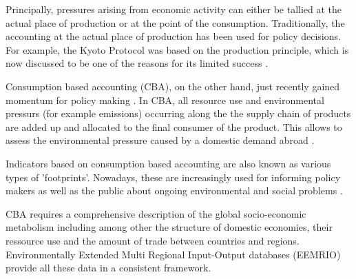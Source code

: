 Principally, pressures arising from economic activity can either be tallied at
the actual place of production or at the point of the consumption.
Traditionally, the accounting at the actual place of production has been used
for policy decisions. For example, the Kyoto Protocol was based on the
production principle, which is now discussed to be one of the reasons for its
limited success \cite{23192129}. 

Consumption based accounting (CBA), on the other hand, just recently gained
momentum for policy making \cite{Harris_2013}. In CBA, all resource use and environmental
pressurs (for example emissions) occurring along the the supply chain of
products are added up and allocated to the final consumer of the product. This
allows to assess the environmental pressure caused by a domestic
demand abroad \cite{Weinzettel_2013, 20212122}.

Indicators based on consumption based accounting are also known as various
types of 'footprints'. Nowadays, these are increasingly used for informing policy makers as
well as the public about ongoing environmental \cite{tukker_global_2014, steen-olsen_carbon_2012, Kanemoto_2014}\cite{united_nations_university_inclusive_2012}
and social problems \cite{Simas_2014}. 

CBA requires a comprehensive description of the global socio-economic
metabolism including among other the structure of domestic economies, their
ressource use and the amount of trade between countries and regions.
Environmentally Extended Multi Regional Input-Output databases (EEMRIO) provide
all these data in a consistent framework. 